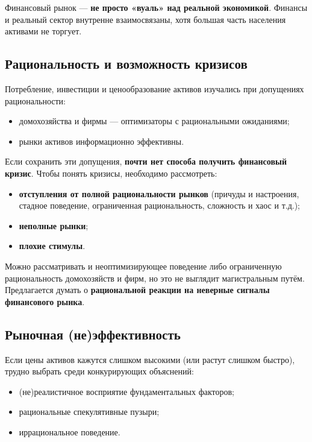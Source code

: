 \documentclass[10pt,a4paper]{article}
\begin{document}
\begin{intuition}
Финансовый рынок — \textbf{не просто «вуаль» над реальной экономикой}. Финансы и реальный сектор внутренне взаимосвязаны, хотя большая часть населения активами не торгует.
\end{intuition}

\subsection{Рациональность и возможность кризисов}

Потребление, инвестиции и ценообразование активов изучались при допущениях рациональности:
\begin{itemize}[leftmargin=1.3em]
\item домохозяйства и фирмы — оптимизаторы с рациональными ожиданиями;
\item рынки активов информационно эффективны.
\end{itemize}
Если сохранить эти допущения, \textbf{почти нет способа получить финансовый кризис}. Чтобы понять кризисы, необходимо рассмотреть:
\begin{itemize}[leftmargin=1.3em]
\item \textbf{отступления от полной рациональности рынков} (причуды и настроения, стадное поведение, ограниченная рациональность, сложность и хаос и т.д.);
\item \textbf{неполные рынки};
\item \textbf{плохие стимулы}.
\end{itemize}
Можно рассматривать и неоптимизирующее поведение либо ограниченную рациональность домохозяйств и фирм, но это не выглядит магистральным путём. Предлагается думать о \textbf{рациональной реакции на неверные сигналы финансового рынка}.

\subsection{Рыночная (не)эффективность}

Если цены активов кажутся слишком высокими (или растут слишком быстро), трудно выбрать среди конкурирующих объяснений:
\begin{itemize}[leftmargin=1.3em]
\item (не)реалистичное восприятие фундаментальных факторов;
\item рациональные спекулятивные пузыри;
\item иррациональное поведение.
\end{itemize}
\end{document}
